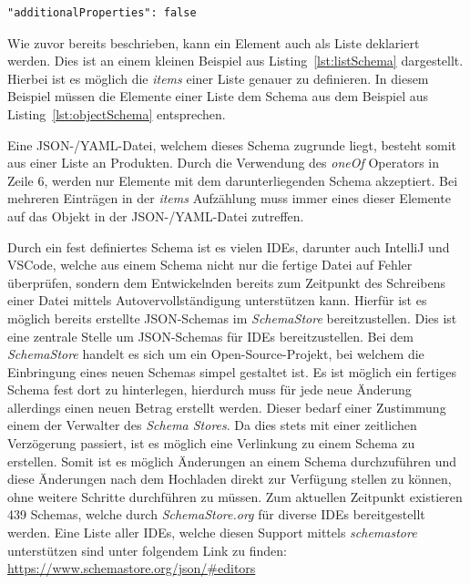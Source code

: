 \begin{lstlisting}[caption={Begrenzung der Properties eines Schemas},label={lst:additionalProperties}]
"additionalProperties": false
\end{lstlisting}

Wie zuvor bereits beschrieben, kann ein Element auch als Liste deklariert werden.
Dies ist an einem kleinen Beispiel aus Listing~\ref{lst:listSchema} dargestellt.
Hierbei ist es möglich die \textit{items} einer Liste genauer zu definieren.
In diesem Beispiel müssen die Elemente einer Liste dem Schema aus dem Beispiel aus Listing~\ref{lst:objectSchema} entsprechen.

Eine JSON-/YAML-Datei, welchem dieses Schema zugrunde liegt, besteht somit aus einer Liste an Produkten.
Durch die Verwendung des \textit{oneOf} Operators in Zeile 6, werden nur Elemente mit dem darunterliegenden Schema akzeptiert.
Bei mehreren Einträgen in der \textit{items} Aufzählung muss immer eines dieser Elemente auf das Objekt in der JSON-/YAML-Datei zutreffen.



Durch ein fest definiertes Schema ist es vielen IDEs, darunter auch IntelliJ und VSCode, welche
aus einem Schema nicht nur die fertige Datei auf Fehler überprüfen, sondern dem Entwickelnden bereits
zum Zeitpunkt des Schreibens einer Datei mittels Autovervollständigung unterstützen kann.
Hierfür ist es möglich bereits erstellte JSON-Schemas im \textit{SchemaStore} bereitzustellen.
Dies ist eine zentrale Stelle um JSON-Schemas für IDEs bereitzustellen.
Bei dem \textit{SchemaStore} handelt es sich um ein Open-Source-Projekt, bei welchem die Einbringung eines neuen Schemas simpel gestaltet ist.
Es ist möglich ein fertiges Schema fest dort zu hinterlegen, hierdurch muss für jede neue Änderung allerdings einen neuen Betrag erstellt werden.
Dieser bedarf einer Zustimmung einem der Verwalter des \textit{Schema Stores}.
Da dies stets mit einer zeitlichen Verzögerung passiert, ist es möglich eine Verlinkung zu einem Schema zu erstellen.
Somit ist es möglich Änderungen an einem Schema durchzuführen und diese Änderungen nach dem Hochladen direkt zur Verfügung stellen zu können, ohne weitere Schritte durchführen zu müssen.
Zum aktuellen Zeitpunkt existieren 439 Schemas, welche durch \textit{SchemaStore.org} für diverse IDEs bereitgestellt werden.\cite*{schemaStore}
Eine Liste aller IDEs, welche diesen Support mittels \textit{schemastore} unterstützen sind unter folgendem
Link zu finden: \url{https://www.schemastore.org/json/#editors}

